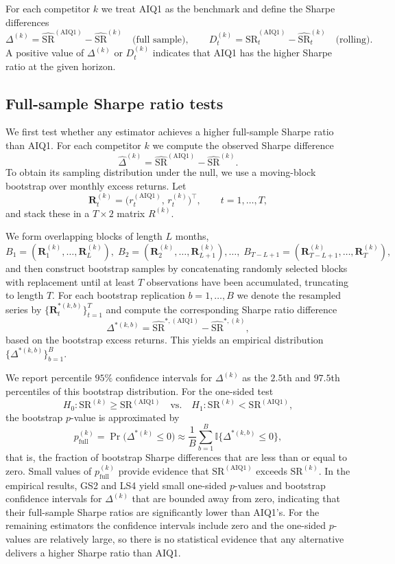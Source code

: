 \documentclass[12pt,letterpaper]{article}
\begin{document}
For each competitor \(k\) we treat AIQ1 as the benchmark and define the Sharpe differences
\[
\Delta^{(k)} = \widehat{\text{SR}}^{(\text{AIQ1})} - \widehat{\text{SR}}^{(k)}
\quad\text{(full sample)},\qquad
D_{t}^{(k)} = \widehat{\text{SR}}_{t}^{(\text{AIQ1})} - \widehat{\text{SR}}_{t}^{(k)}
\quad\text{(rolling)}.
\]
A positive value of \(\Delta^{(k)}\) or \(D_{t}^{(k)}\) indicates that AIQ1 has the higher Sharpe ratio at the given horizon.

\subsection*{Full-sample Sharpe ratio tests}

We first test whether any estimator achieves a higher full-sample Sharpe ratio than AIQ1. For each competitor \(k\) we compute the observed Sharpe difference
\[
\widehat{\Delta}^{(k)} = \widehat{\text{SR}}^{(\text{AIQ1})} - \widehat{\text{SR}}^{(k)}.
\]
To obtain its sampling distribution under the null, we use a moving-block bootstrap over monthly excess returns. Let
\[
\mathbf{R}_{t}^{(k)} = \bigl(r_{t}^{(\text{AIQ1})},\,r_{t}^{(k)}\bigr)^{\top},
\qquad t=1,\dots,T,
\]
and stack these in a \(T\times 2\) matrix \(R^{(k)}\).

We form overlapping blocks of length \(L\) months,
\[
B_{1} = (\mathbf{R}_{1}^{(k)},\dots,\mathbf{R}_{L}^{(k)}),\;
B_{2} = (\mathbf{R}_{2}^{(k)},\dots,\mathbf{R}_{L+1}^{(k)}),\dots,\;
B_{T-L+1} = (\mathbf{R}_{T-L+1}^{(k)},\dots,\mathbf{R}_{T}^{(k)}),
\]
and then construct bootstrap samples by concatenating randomly selected blocks with replacement until at least \(T\) observations have been accumulated, truncating to length \(T\). For each bootstrap replication \(b=1,\dots,B\) we denote the resampled series by \(\{\mathbf{R}_{t}^{*(k,b)}\}_{t=1}^{T}\) and compute the corresponding Sharpe ratio difference
\[
\Delta^{*(k,b)} = \widehat{\text{SR}}^{*,(\text{AIQ1})} - \widehat{\text{SR}}^{*,(k)},
\]
based on the bootstrap excess returns. This yields an empirical distribution \(\{\Delta^{*(k,b)}\}_{b=1}^{B}\).

We report percentile \(95\%\) confidence intervals for \(\Delta^{(k)}\) as the \(2.5\)th and \(97.5\)th percentiles of this bootstrap distribution. For the one-sided test
\[
H_{0}: \text{SR}^{(k)} \ge \text{SR}^{(\text{AIQ1})}
\quad\text{vs.}\quad
H_{1}: \text{SR}^{(k)} < \text{SR}^{(\text{AIQ1})},
\]
the bootstrap \(p\)-value is approximated by
\[
p^{(k)}_{\text{full}} 
= \Pr\!\bigl(\Delta^{*(k)} \le 0\bigr)
\approx \frac{1}{B}\sum_{b=1}^{B} \mathbb{I}\{\Delta^{*(k,b)} \le 0\},
\]
that is, the fraction of bootstrap Sharpe differences that are less than or equal to zero. Small values of \(p^{(k)}_{\text{full}}\) provide evidence that \(\text{SR}^{(\text{AIQ1})}\) exceeds \(\text{SR}^{(k)}\). In the empirical results, GS2 and LS4 yield small one-sided \(p\)-values and bootstrap confidence intervals for \(\Delta^{(k)}\) that are bounded away from zero, indicating that their full-sample Sharpe ratios are significantly lower than AIQ1's. For the remaining estimators the confidence intervals include zero and the one-sided \(p\)-values are relatively large, so there is no statistical evidence that any alternative delivers a higher Sharpe ratio than AIQ1.
\end{document}
